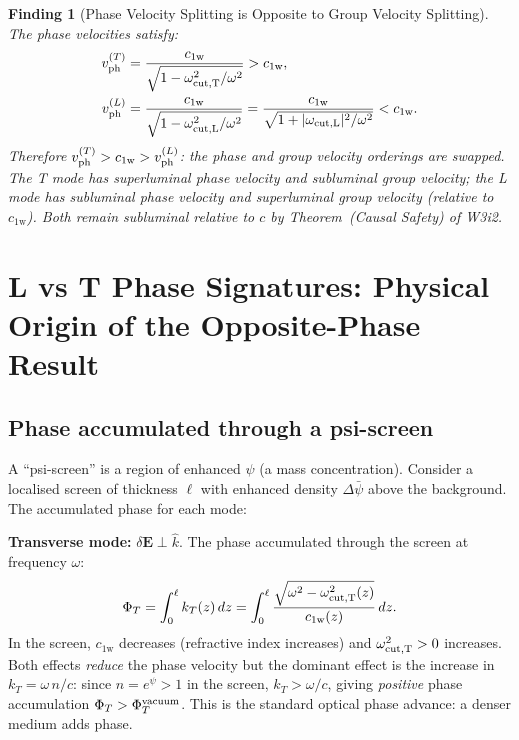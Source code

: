 \documentclass[11pt]{article}
\newtheorem{finding}{Finding}
\newcommand{\cfield}{c_{1\mathrm{w}}}
\newcommand{\PhiT}{\Phi_T}
\newcommand{\psibar}{\bar{\psi}}
\begin{document}
\begin{finding}[Phase Velocity Splitting is Opposite to Group Velocity Splitting]
The phase velocities satisfy:
\begin{align}
v_{\rm ph}^{(T)} &= \frac{\cfield}{\sqrt{1 - \omega_{\rm cut,T}^2/\omega^2}}
> \cfield, \label{eq:vphT}\\
v_{\rm ph}^{(L)} &= \frac{\cfield}{\sqrt{1 - \omega_{\rm cut,L}^2/\omega^2}}
= \frac{\cfield}{\sqrt{1 + |\omega_{\rm cut,L}|^2/\omega^2}}
< \cfield. \label{eq:vphL}
\end{align}
Therefore $v_{\rm ph}^{(T)} > \cfield > v_{\rm ph}^{(L)}$: the phase and group
velocity orderings are \emph{swapped}. The T mode has superluminal phase velocity
and subluminal group velocity; the L mode has subluminal phase velocity and
superluminal group velocity (relative to $\cfield$). Both remain subluminal relative
to $c$ by Theorem~(Causal Safety) of W3i2.
\end{finding}

\section{L vs T Phase Signatures: Physical Origin of the Opposite-Phase Result}
\label{sec:phase-origin}

\subsection{Phase accumulated through a psi-screen}

A ``psi-screen'' is a region of enhanced $\psi$ (a mass concentration). Consider a
localised screen of thickness $\ell$ with enhanced density $\Delta\psibar$ above
the background. The accumulated phase for each mode:

\textbf{Transverse mode:} $\delta\mathbf{E} \perp \hat{k}$.
The phase accumulated through the screen at frequency $\omega$:
\begin{equation}
\PhiT = \int_0^\ell k_T(z)\,dz = \int_0^\ell \frac{\sqrt{\omega^2 - \omega_{\rm cut,T}^2(z)}}{\cfield(z)}\,dz.
\label{eq:PhiT}
\end{equation}
In the screen, $\cfield$ decreases (refractive index increases) and
$\omega_{\rm cut,T}^2 > 0$ increases. Both effects \emph{reduce} the phase velocity
but the dominant effect is the increase in $k_T = \omega\,n/c$:
since $n = e^\psi > 1$ in the screen, $k_T > \omega/c$, giving
\emph{positive} phase accumulation $\PhiT > \PhiT^{\rm vacuum}$. This is the
standard optical phase advance: a denser medium adds phase.
\end{document}
